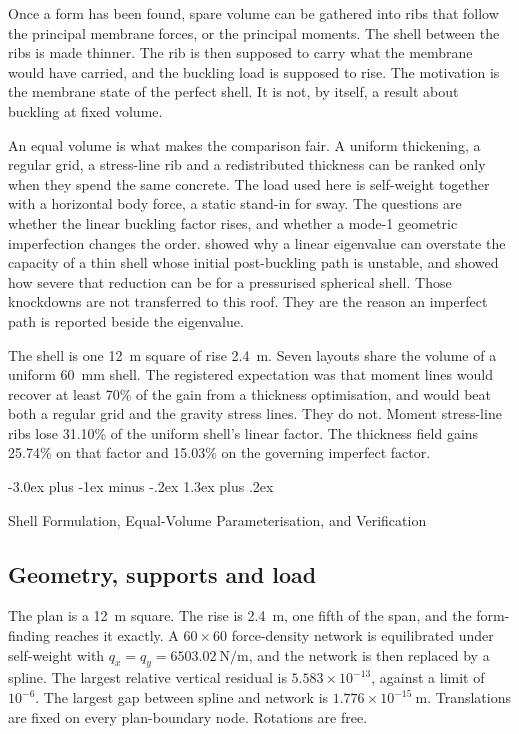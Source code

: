 \documentclass[11pt,a4paper]{article}
\makeatletter
\renewcommand\section{\@startsection{section}{1}{\z@}%
  {-3.0ex plus -1ex minus -.2ex}%
  {1.3ex plus .2ex}%
  {\normalfont\Large\bfseries\raggedright}}
\makeatother
\begin{document}
Once a form has been found, spare volume can be gathered into ribs that follow the principal membrane forces, or the principal moments.
The shell between the ribs is made thinner.
The rib is then supposed to carry what the membrane would have carried, and the buckling load is supposed to rise.
The motivation is the membrane state of the perfect shell.
It is not, by itself, a result about buckling at fixed volume.

An equal volume is what makes the comparison fair.
A uniform thickening, a regular grid, a stress-line rib and a redistributed thickness can be ranked only when they spend the same concrete.
The load used here is self-weight together with a horizontal body force, a static stand-in for sway.
The questions are whether the linear buckling factor rises, and whether a mode-1 geometric imperfection changes the order.
\cite{koiter1945} showed why a linear eigenvalue can overstate the capacity of a thin shell whose initial post-buckling path is unstable, and \cite{hutchinson1967} showed how severe that reduction can be for a pressurised spherical shell.
Those knockdowns are not transferred to this roof.
They are the reason an imperfect path is reported beside the eigenvalue.

The shell is one 12~m square of rise 2.4~m.
Seven layouts share the volume of a uniform 60~mm shell.
The registered expectation was that moment lines would recover at least 70\% of the gain from a thickness optimisation, and would beat both a regular grid and the gravity stress lines.
They do not.
Moment stress-line ribs lose 31.10\% of the uniform shell's linear factor.
The thickness field gains 25.74\% on that factor and 15.03\% on the governing imperfect factor.

\section{Shell Formulation, Equal-Volume Parameterisation, and Verification}
\label{sec:formulation}

\subsection{Geometry, supports and load}

The plan is a 12~m square.
The rise is 2.4~m, one fifth of the span, and the form-finding reaches it exactly.
A \(60\times 60\) force-density network is equilibrated under self-weight with \(q_x = q_y = 6503.02~\mathrm{N/m}\), and the network is then replaced by a spline.
The largest relative vertical residual is \(5.583\times 10^{-13}\), against a limit of \(10^{-6}\).
The largest gap between spline and network is \(1.776\times 10^{-15}~\mathrm{m}\).
Translations are fixed on every plan-boundary node.
Rotations are free.
\end{document}
